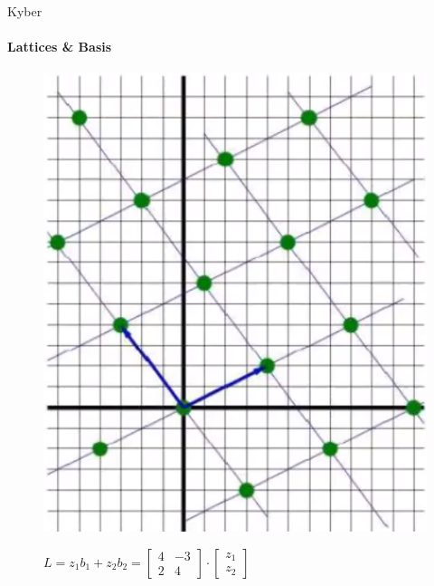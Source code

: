 \documentclass{rosenpass-beamer}
\begin{document}
\begin{frame}{Kyber}
  \framesubtitle{Lattices \& Basis}
\begin{figure}
  \begin{minipage}{.45\textwidth}
    \centering
    \includegraphics[height=\textwidth]{assets/lattice.png}
  \end{minipage}\hfill
  \begin{minipage}{.45\textwidth}
    \centering
    \(L = {z_1b_1 + z_2b_2} = {\begin{bmatrix}4 & -3\\2 & 4\end{bmatrix} \cdot \begin{bmatrix}z_1\\z_2 \end{bmatrix}}\)
  \end{minipage}
\end{figure}
\end{frame}

\end{document}
